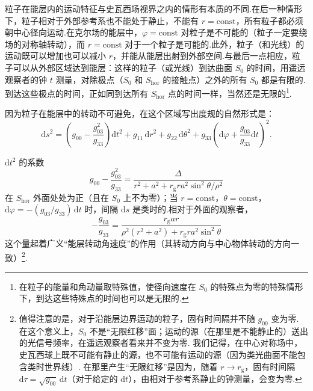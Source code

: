 粒子在能层内的运动特征与史瓦西场视界之内的情形有本质的不同.在后一种情形下，粒子相对于外部参考系也不能处于静止，不能有 $r=\mathrm{const}$，所有粒子都必须朝中心径向运动.在克尔场的能层中，$\varphi=\mathrm{const}$ 对粒子是不可能的（粒子一定要绕场的对称轴转动），而 $r=\mathrm{const}$ 对于一个粒子是可能的.此外，粒子（和光线）的运动既可以增加也可以减小 $r$，并能从能层出射到外部空间.与最后一点相应，粒子可以从外部区域达到能层：这样的粒子（或光线）到达曲面 $S_0$ 的时间，用遥远观察者的钟 $t$ 测量，对除极点（$S_0$ 和 $S_{\mathrm{hor}}$ 的接触点）之外的所有 $S_0$ 都是有限的.到达这些极点的时间，正如同到达所有 $S_{\mathrm{hor}}$ 点的时间一样，当然还是无限的\footnote{在粒子的能量和角动量取特殊值，使径向速度在 $S_{0}$ 的特殊点为零的特殊情形下，到达这些特殊点的时间也可以是无限的.}.

因为粒子在能层中的转动不可避免，在这个区域写出度规的自然形式是：
\begin{equation}
  \mathrm{d}s^{2}
  =\left(g_{00}-\frac{g_{03}^{2}}{g_{33}}\right)\mathrm{d}t^{2}
  +g_{11}\,\mathrm{d}r^{2}+g_{22}\,\mathrm{d}\theta^{2}
  +g_{33}\left(\mathrm{d}\varphi
  +\frac{g_{03}}{g_{33}}\mathrm{d}t\right)^{2}.
\end{equation}

$\mathrm{d}t^{2}$ 的系数
\begin{equation*}
  g_{00}-\frac{g_{03}^{2}}{g_{33}}
  =\frac{\varDelta}{r^{2}+a^{2}
  +r_{\mathrm{g}}ra^{2}\sin^{2}\theta/\rho^{2}}
\end{equation*}
在 $S_{\mathrm{hor}}$ 外面处处为正（且在 $S_0$ 上不为零）；当 $r=\mathrm{const}$，$\theta=\mathrm{const}$，$\mathrm{d}\varphi=-(g_{03}/g_{33})\,\mathrm{d}t$ 时，间隔 $\mathrm{d}s$ 是类时的.相对于外面的观察者，
\begin{equation}
  -\frac{g_{03}}{g_{33}}
  =\frac{r_{\mathrm{g}}ar}
  {\rho^{2}(r^{2}+a^{2})+r_{\mathrm{g}}ra^{2}\sin^{2}\theta}
\end{equation}
这个量起着广义“能层转动角速度”的作用（其转动方向与中心物体转动的方向一致）\footnote{值得注意的是，对于沿能层边界运动的粒子，固有时间隔并不随 $g_{00}$ 变为零. 在这个意义上，$S_{0}$ 不是“无限红移”面；运动的源（在那里是不能静止的）送出的光信号频率，在遥远观察者看来并不变为零. 我们记得，在中心对称场中，史瓦西球上既不可能有静止的源，也不可能有运动的源（因为类光曲面不能包含类时世界线）. 在那里产生“无限红移”是因为，随着 $r\to r_{\mathrm{g}}$，固有时间隔 $\mathrm{d}\tau=\sqrt{g_{00}}\,\mathrm{d}t$（对于给定的 $\mathrm{d}t$），由相对于参考系静止的钟测量，会变为零.}.

